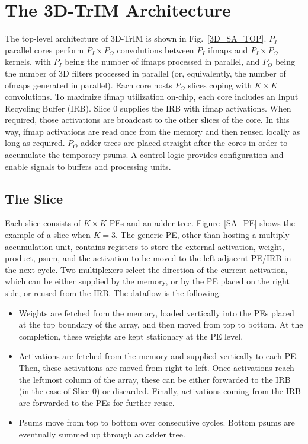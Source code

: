 \section{The 3D-TrIM Architecture}


The top-level architecture of 3D-TrIM is shown in Fig.~\ref{3D_SA_TOP}. $P_I$ parallel cores perform $P_I \times P_O$ convolutions between $P_I$ ifmaps and $P_I \times P_O$ kernels, with $P_I$ being the number of ifmaps processed in parallel, and $P_O$ being the number of 3D filters processed in parallel (or, equivalently, the number of ofmaps generated in parallel). Each core hosts $P_O$ slices coping with $K \times K$ convolutions. To maximize ifmap utilization on-chip, each core includes an Input Recycling Buffer (IRB). Slice 0 supplies the IRB with ifmap activations. When required, those activations are broadcast to the other slices of the core. In this way, ifmap activations are read once from the memory and then reused locally as long as required. $P_O$ adder trees are placed straight after the cores in order to accumulate the temporary psums. A control logic provides configuration and enable signals to buffers and processing units.

\subsection{The Slice}


Each slice consists of $K \times K$ PEs and an adder tree. Figure~\ref{SA_PE} shows the example of a slice when $K=3$. The generic PE, other than hosting a multiply-accumulation unit, contains registers to store the external activation, weight, product, psum, and the activation to be moved to the left-adjacent PE/IRB in the next cycle. Two multiplexers select the direction of the current activation, which can be either supplied by the memory, or by the PE placed on the right side, or reused from the IRB.
The dataflow is the following:
\begin{itemize}
    \item Weights are fetched from the memory, loaded vertically into the PEs placed at the top boundary of the array, and then moved from top to bottom. At the completion, these weights are kept stationary at the PE level.
    \item Activations are fetched from the memory and supplied vertically to each PE. Then, these activations are moved from right to left. Once activations reach the leftmost column of the array, these can be either forwarded to the IRB (in the case of Slice 0) or discarded. Finally, activations coming from the IRB are forwarded to the PEs for further reuse. 
    \item Psums move from top to bottom over consecutive cycles. Bottom psums are eventually summed up through an adder tree.
\end{itemize}

